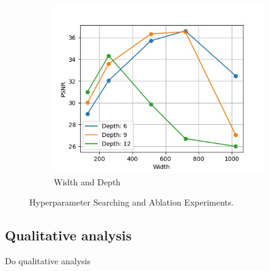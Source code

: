 \documentclass{article}
\begin{document}
\begin{figure}[h]
\begin{subfigure}{0.3\textwidth}
\includegraphics[width=1\linewidth]{Width_Depth.jpg}
    \caption{Width and Depth}
\end{subfigure}
\caption{Hyperparameter Searching and Ablation Experiments.}
\label{fig_abl}
\end{figure}


\subsection{Qualitative analysis}
\label{sec_qua}

Do qualitative analysis
\end{document}
